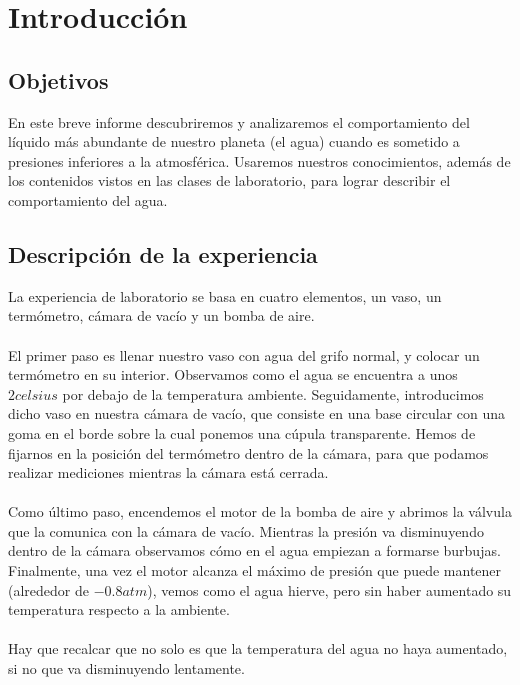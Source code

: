 \section{Introducción}
    \subsection{Objetivos}
        En este breve informe descubriremos y analizaremos el comportamiento del líquido más abundante de nuestro planeta (el agua) cuando es sometido a presiones inferiores a la atmosférica. Usaremos nuestros conocimientos, además de los contenidos vistos en las clases de laboratorio, para lograr describir el comportamiento del agua.
    \subsection{Descripción de la experiencia}
        La experiencia de laboratorio se basa en cuatro elementos, un vaso, un termómetro, cámara de vacío y un bomba de aire.\\ \\
        El primer paso es llenar nuestro vaso con agua del grifo normal, y colocar un termómetro en su interior. Observamos como el agua se encuentra a unos $2\si{celsius}$ por debajo de la temperatura ambiente. Seguidamente, introducimos dicho vaso en nuestra cámara de vacío, que consiste en una base circular con una goma en el borde sobre la cual ponemos una cúpula transparente. Hemos de fijarnos en la posición del termómetro dentro de la cámara, para que podamos realizar mediciones mientras la cámara está cerrada. \\ \\ Como último paso, encendemos el motor de la bomba de aire y abrimos la válvula que la comunica con la cámara de vacío. Mientras la presión va disminuyendo dentro de la cámara observamos cómo en el agua empiezan a formarse burbujas. Finalmente, una vez el motor alcanza el máximo de presión que puede mantener (alrededor de $-0.8\textit{atm}$), vemos como el agua hierve, pero sin haber aumentado su temperatura respecto a la ambiente.\\ \\Hay que recalcar que no solo es que la temperatura del agua no haya aumentado, si no que va disminuyendo lentamente.

